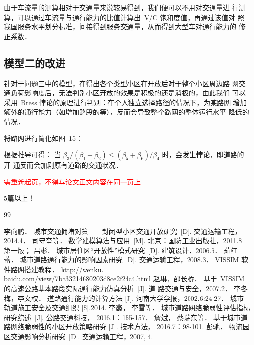 \documentclass[a4paper]{nmmcm}
\begin{document}
由于车流量的测算相对于交通量来说较易得到，我们便可以不用对交通量进
行测算，可以通过车流量与通行能力的比值计算出~V/C 饱和度值，再通过该值对
照我国服务水平划分标准，间接得到服务交通量，从而得到大型车对通行能力的
修正系数．


\subsection{模型二的改进}

针对于问题三中的模型，在得出各个类型小区在开放后对于整个小区周边路
网交通负荷影响度后，无法判别小区开放的效果是积极的还是消极的，由此我们
可以采用~Bress 悖论的原理进行判别：在个人独立选择路径的情况下，为某路网
增加额外的通行能力（如增加路段的等），反而会导致整个路网的整体运行水平
降低的情况．

将路网进行简化如图~15：

根据推导可得： 当 $\beta_{3}/\left(\beta_{1}+\beta_{2}\right) \leq\left(\beta_{5}+\beta_{6}\right)/\beta_{4}$ 时，会发生悖论，即道路的开
通反而会加剧原有道路的交通状况．

\textcolor{red}{需重新起页，不得与论文正文内容在同一页上}

\begin{rmk}
5篇以上！
\end{rmk}

\newpage

\begin{thebibliography}{99}
 李向鹏． 城市交通拥堵对策——封闭型小区交通开放研究~[D]. 交通运输工程，
2014.4．
 司守奎等． 数学建模算法与应用~[M]. 北京：国防工业出版社，2011.8 第一版；
 吕彬． 城市居住区“开放性”模式研究~[D]. 建筑设计，2006.6．
 茹红蕾． 城市道路通行能力的影响因素研究~[D]. 交通运输工程，2008.3．
 VISSIM 软件路网搭建教程．
\url{http://wenku. baidu.com/view/7bc33214680203d8ce2f24c4.html}
 赵琳，邵长桥． 基于~VISSIM 的高速公路基本路段实际通行能力仿真分析~[J]. 道
路交通与安全，2007.2．
 李冬梅，李文权． 道路通行能力的计算方法 [J]. 河南大学学报，2002.6:24-27．
 城市轨道施工安全及交通组织 [S].2014.
 李鑫， 李雪等． 城市道路网络脆弱性评估指标研究综述~[J]. 公路交通科技，
2016.1：155-157．
 詹斌， 蔡瑞东等． 基于城市道路网络脆弱性的小区开放策略研究 [J]. 技术方法，
2016.7：98-101.
 彭驰． 物流园区交通影响分析研究~[D]. 交通运输工程，2007, 4.

\end{thebibliography}
\newpage
\end{document}
